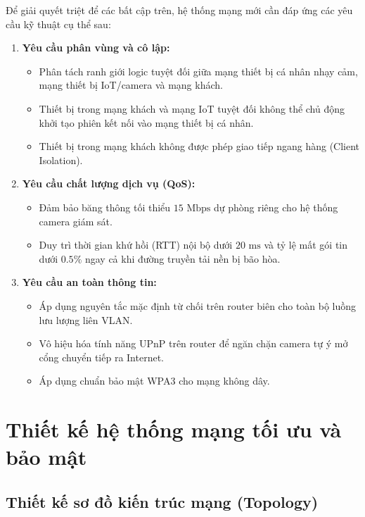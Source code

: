 Để giải quyết triệt để các bất cập trên, hệ thống mạng mới cần đáp ứng các yêu cầu kỹ thuật cụ thể sau:
\begin{enumerate}
    \item \textbf{Yêu cầu phân vùng và cô lập:}
    \begin{itemize}
        \item Phân tách ranh giới logic tuyệt đối giữa mạng thiết bị cá nhân nhạy cảm, mạng thiết bị IoT/camera và mạng khách.
        \item Thiết bị trong mạng khách và mạng IoT tuyệt đối không thể chủ động khởi tạo phiên kết nối vào mạng thiết bị cá nhân.
        \item Thiết bị trong mạng khách không được phép giao tiếp ngang hàng (Client Isolation).
    \end{itemize}
    \item \textbf{Yêu cầu chất lượng dịch vụ (QoS):}
    \begin{itemize}
        \item Đảm bảo băng thông tối thiểu $15\text{ Mbps}$ dự phòng riêng cho hệ thống camera giám sát.
        \item Duy trì thời gian khứ hồi (RTT) nội bộ dưới $20\text{ ms}$ và tỷ lệ mất gói tin dưới $0.5\%$ ngay cả khi đường truyền tải nền bị bão hòa.
    \end{itemize}
    \item \textbf{Yêu cầu an toàn thông tin:}
    \begin{itemize}
        \item Áp dụng nguyên tắc mặc định từ chối trên router biên cho toàn bộ luồng lưu lượng liên VLAN.
        \item Vô hiệu hóa tính năng UPnP trên router để ngăn chặn camera tự ý mở cổng chuyển tiếp ra Internet.
        \item Áp dụng chuẩn bảo mật WPA3 cho mạng không dây.
    \end{itemize}
\end{enumerate}

\section{Thiết kế hệ thống mạng tối ưu và bảo mật}
\label{sec:thiet-ke-he-thong-mang}

\subsection{Thiết kế sơ đồ kiến trúc mạng (Topology)}
\label{subsec:thiet-ke-topology}

